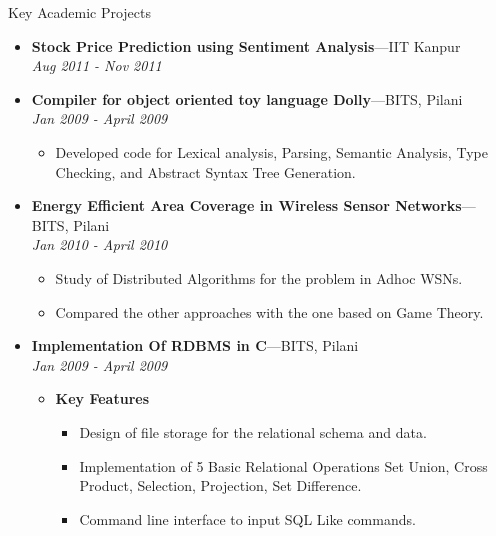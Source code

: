 \documentclass[11pt,oneside]{article}
\newenvironment{ressection}[1]{
	\vspace{4pt}
	{\fontfamily{phv}\selectfont\Large#1}
	\begin{itemize}
	\vspace{3pt}
}{
	\end{itemize}
}
\newcommand{\resitem}[1]{
	\vspace{-4pt}
	\item \begin{flushleft} #1 \end{flushleft}
}
\newcommand{\ressubitem}[1]{
	\vspace{-1pt}
	\item \begin{flushleft} #1 \end{flushleft}
}
\newcommand{\resbigitem}[3]{
	\vspace{-5pt}
	\item
	\textbf{#1}---#2 \\
	\textit{#3}
}
\newenvironment{ressubsec}[3]{
	\resbigitem{#1}{#2}{#3}
	\vspace{-2pt}
	\begin{itemize}
}{
	\end{itemize}
}
\newenvironment{reslist}[1]{
	\resitem{\textbf{#1}}
	\vspace{-5pt}
	\begin{itemize}
}{
	\end{itemize}
}
\begin{document}
\begin{ressection}{Key Academic Projects}
\begin{ressubsec}{Stock Price Prediction using Sentiment Analysis}{IIT Kanpur}{Aug 2011 - Nov 2011}
  \end{ressubsec}  

  \begin{ressubsec}{Compiler for object oriented toy language Dolly}{BITS, Pilani}{Jan 2009 - April 2009}
  
      \resitem{Developed code for Lexical analysis, Parsing, Semantic Analysis, Type Checking, and Abstract Syntax Tree Generation.}
      
  \end{ressubsec}

  \begin{ressubsec}{Energy Efficient Area Coverage in Wireless Sensor Networks}{BITS, Pilani}{Jan 2010 - April 2010}
  
    \resitem{Study of Distributed Algorithms for the problem in Adhoc WSNs.}
    \resitem{Compared the other approaches with the one based on Game Theory.}
  
  \end{ressubsec}

  \begin{ressubsec}{Implementation Of RDBMS in C}{BITS, Pilani}{Jan 2009 - April 2009}
  
    \begin{reslist}{Key Features}
     
	\ressubitem{Design of file storage for the relational schema and data.}
	\ressubitem{Implementation of 5 Basic Relational Operations Set Union, Cross Product, Selection, Projection, Set Difference. }
	\ressubitem{Command line interface to input SQL Like commands.}

    \end{reslist}

  \end{ressubsec}


\end{ressection}
\end{document}

